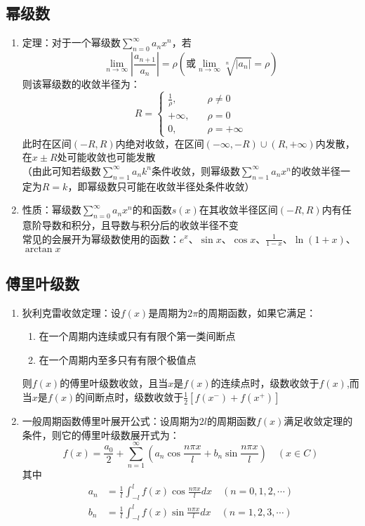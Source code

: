 \documentclass[12pt,a4paper,UTF8]{book}
\begin{document}
\subsection{幂级数}
\begin{enumerate}
\item 定理：对于一个幂级数$\sum\limits_{n=0}^{\infty}a_nx^n$，若
\[\lim\limits_{n\to\infty}\left|\frac{a_{n+1}}{a_n}\right|=\rho\left(\text{或}\lim\limits_{n\to\infty}\sqrt[n]{\left|a_n\right|}=\rho\right)\]
则该幂级数的收敛半径为：
\[R=\left\{\begin{aligned}
\frac{1}{\rho},&\quad\rho\ne0\\
+\infty,&\quad\rho=0\\
0,&\quad\rho=+\infty
\end{aligned}\right.\]
此时在区间$\left(-R,R\right)$内绝对收敛，在区间$\left(-\infty,-R\right)\cup\left(R,+\infty\right)$内发散，在$x\pm R$处可能收敛也可能发散\\
（由此可知若级数$\sum\limits_{n=1}^{\infty}a_nk^n$条件收敛，则幂级数$\sum\limits_{n=1}^{\infty}a_nx^n$的收敛半径一定为$R=k$，即幂级数只可能在收敛半径处条件收敛）
\item 性质：幂级数$\sum\limits_{n=0}^{\infty}a_nx^n$的和函数$s\left(x\right)$在其收敛半径区间$\left(-R,R\right)$内有任意阶导数和积分，且导数与积分后的收敛半径不变\\
常见的会展开为幂级数使用的函数：$e^x$、$\sin x$、$\cos x$、$\frac{1}{1-x}$、$\ln\left(1+x\right)$、$\arctan x$
\end{enumerate}

\subsection{傅里叶级数}
\begin{enumerate}
\item 狄利克雷收敛定理：设$f\left(x\right)$是周期为$2\pi$的周期函数，如果它满足：
\begin{enumerate}
\item 在一个周期内连续或只有有限个第一类间断点
\item 在一个周期内至多只有有限个极值点
\end{enumerate}
则$f\left(x\right)$的傅里叶级数收敛，且当$x$是$f\left(x\right)$的连续点时，级数收敛于$f\left(x\right)$,而当$x$是$f\left(x\right)$的间断点时，级数收敛于$\frac{1}{2}\left[f\left(x^-\right)+f\left(x^+\right)\right]$
\item 一般周期函数傅里叶展开公式：设周期为$2l$的周期函数$f\left(x\right)$满足收敛定理的条件，则它的傅里叶级数展开式为：
\[f\left(x\right)=\frac{a_0}{2}+\sum\limits_{n=1}^{\infty}\left(a_n\cos\frac{n\pi x}{l}+b_n\sin\frac{n\pi x}{l}\right)\quad\left(x\in C\right)\]
其中
\[\begin{aligned}
a_n&=\frac{1}{l}\int_{-l}^{l}f\left(x\right)\cos\frac{n\pi x}{l}dx\quad\left(n=0,1,2,\cdots\right)\\
b_n&=\frac{1}{l}\int_{-l}^{l}f\left(x\right)\sin\frac{n\pi x}{l}dx\quad\left(n=1,2,3,\cdots\right)
\end{aligned}\]
\end{enumerate}
\end{document}
